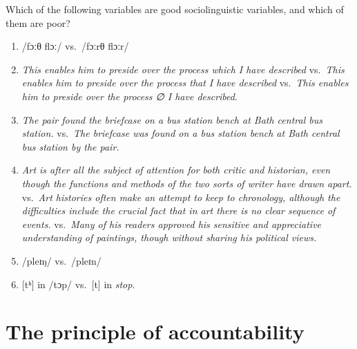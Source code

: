 \documentclass[
  11pt,
  letterpaper,
  DIV=11,
  numbers=noendperiod]{scrreprt}
\providecommand{\tightlist}{%
  \setlength{\itemsep}{0pt}\setlength{\parskip}{0pt}}\usepackage{longtable,booktabs,array}
\begin{document}
\begin{tcolorbox}[enhanced jigsaw, toprule=.15mm, opacitybacktitle=0.6, coltitle=black, arc=.35mm, colback=white, title=\textcolor{quarto-callout-caution-color}{\faFire}\hspace{0.5em}{Discussion}, titlerule=0mm, toptitle=1mm, bottomtitle=1mm, breakable, rightrule=.15mm, opacityback=0, bottomrule=.15mm, leftrule=.75mm, colframe=quarto-callout-caution-color-frame, left=2mm, colbacktitle=quarto-callout-caution-color!10!white]

Which of the following variables are good sociolinguistic variables, and
which of them are poor?

\begin{enumerate}
\def\labelenumi{\arabic{enumi}.}
\tightlist
\item
  /fɔːθ flɔː/ vs.~/fɔːrθ flɔːr/
\item
  \emph{This enables him to preside over the process which I have
  described} vs.~\emph{This enables him to preside over the process that
  I have described} vs.~\emph{This enables him to preside over the
  process ∅ I have described}.
\item
  \emph{The pair found the briefcase on a bus station bench at Bath
  central bus station.} vs.~\emph{The briefcase was found on a bus
  station bench at Bath central bus station by the pair.}
\item
  \emph{Art is after all the subject of attention for both critic and
  historian, even though the functions and methods of the two sorts of
  writer have drawn apart.} vs.~\emph{Art histories often make an
  attempt to keep to chronology, although the difficulties include the
  crucial fact that in art there is no clear sequence of events.}
  vs.~\emph{Many of his readers approved his sensitive and appreciative
  understanding of paintings, though without sharing his political
  views.}
\item
  /pleɪŋ/ vs.~/pleɪn/
\item
  {[}tʰ{]} in /tɔp/ vs.~{[}t{]} in \emph{stop}.
\end{enumerate}

\end{tcolorbox}

\section{The principle of
accountability}\label{the-principle-of-accountability}
\end{document}

